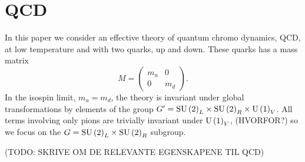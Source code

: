 \section{QCD}

In this paper we consider an effective theory of quantum chromo dynamics, QCD, at low temperature and with two quarks, up and down.
These quarks has a mass matrix 
\begin{equation}
    \label{Mass matrix}
    M =
    \begin{pmatrix}
        m_u & 0 \\
        0 & m_d
    \end{pmatrix}.
\end{equation}
In the isospin limit, $m_u = m_d$, the theory is invariant under global transformations by elements of the group $G' = \mathrm{SU}\left(2\right)_L \times \mathrm{SU}\left(2\right)_R \times \mathrm{U}\left(1\right)_V$.
All terms involving only pions are trivially invariant under $\mathrm{U}\left(1\right)_V$, (HVORFOR?) so we focus on the $G = \mathrm{SU}\left(2\right)_L \times \mathrm{SU}\left(2\right)_R$ subgroup.

(TODO: SKRIVE OM DE RELEVANTE EGENSKAPENE TIL QCD)